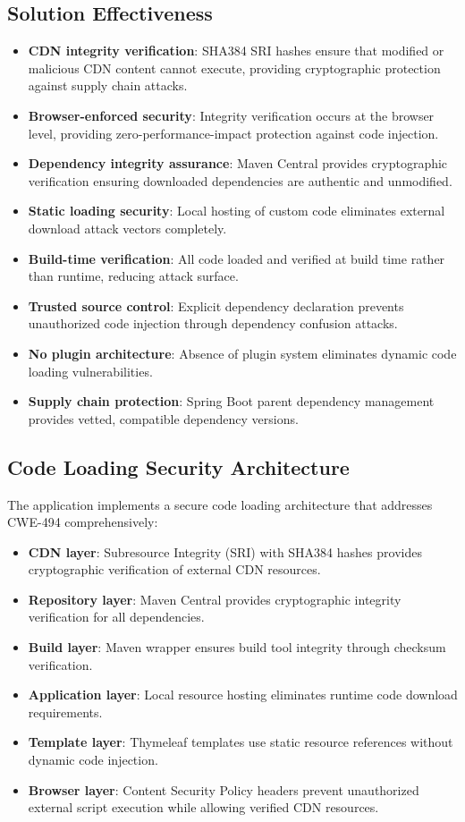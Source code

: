 \documentclass[]{UCD_CS_FYP_Report}
\begin{document}
\subsection{Solution Effectiveness}
\begin{itemize}
	\item \textbf{CDN integrity verification}: SHA384 SRI hashes ensure that modified or malicious CDN content cannot execute, providing cryptographic protection against supply chain attacks.
	\item \textbf{Browser-enforced security}: Integrity verification occurs at the browser level, providing zero-performance-impact protection against code injection.
	\item \textbf{Dependency integrity assurance}: Maven Central provides cryptographic verification ensuring downloaded dependencies are authentic and unmodified.
	\item \textbf{Static loading security}: Local hosting of custom code eliminates external download attack vectors completely.
	\item \textbf{Build-time verification}: All code loaded and verified at build time rather than runtime, reducing attack surface.
	\item \textbf{Trusted source control}: Explicit dependency declaration prevents unauthorized code injection through dependency confusion attacks.
	\item \textbf{No plugin architecture}: Absence of plugin system eliminates dynamic code loading vulnerabilities.
	\item \textbf{Supply chain protection}: Spring Boot parent dependency management provides vetted, compatible dependency versions.
\end{itemize}

\subsection{Code Loading Security Architecture}
The application implements a secure code loading architecture that addresses CWE-494 comprehensively:
\begin{itemize}
	\item \textbf{CDN layer}: Subresource Integrity (SRI) with SHA384 hashes provides cryptographic verification of external CDN resources.
	\item \textbf{Repository layer}: Maven Central provides cryptographic integrity verification for all dependencies.
	\item \textbf{Build layer}: Maven wrapper ensures build tool integrity through checksum verification.
	\item \textbf{Application layer}: Local resource hosting eliminates runtime code download requirements.
	\item \textbf{Template layer}: Thymeleaf templates use static resource references without dynamic code injection.
	\item \textbf{Browser layer}: Content Security Policy headers prevent unauthorized external script execution while allowing verified CDN resources.
\end{itemize}
\end{document}
